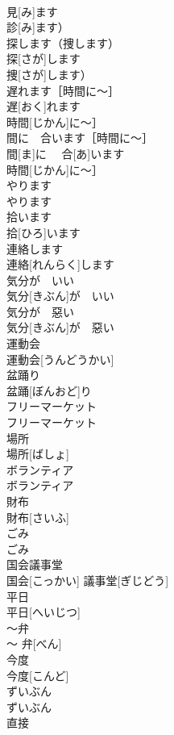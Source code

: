 \documentclass[8pt]{extreport}
\begin{document}
\begin{CJK}{UTF8}{min}
\\	見[み]ます
\\	診[み]ます）	
\\	探します（捜します）	
\\	探[さが]します
\\	捜[さが]します）	
\\	遅れます［時間に〜］	
\\	遅[おく]れます
\\	時間[じかん]に〜］	
\\	間に　合います［時間に〜］	
\\	間[ま]に　 合[あ]います
\\	時間[じかん]に〜］	
\\	やります	
\\	やります	
\\	拾います	
\\	拾[ひろ]います	
\\	連絡します	
\\	連絡[れんらく]します	
\\	気分が　いい	
\\	気分[きぶん]が　いい	
\\	気分が　惡い	
\\	気分[きぶん]が　惡い	
\\	運動会	
\\	運動会[うんどうかい]	
\\	盆踊り	
\\	盆踊[ぼんおど]り	
\\	フリーマーケット	
\\	フリーマーケット	
\\	場所	
\\	場所[ばしょ]	
\\	ボランティア	
\\	ボランティア	
\\	財布	
\\	財布[さいふ]	
\\	ごみ	
\\	ごみ	
\\	国会議事堂	
\\	国会[こっかい] 議事堂[ぎじどう]	
\\	平日	
\\	平日[へいじつ]	
\\	〜弁	
\\	〜 弁[べん]	
\\	今度	
\\	今度[こんど]	
\\	ずいぶん	
\\	ずいぶん	
\\	直接	

\end{CJK}
\end{document}
